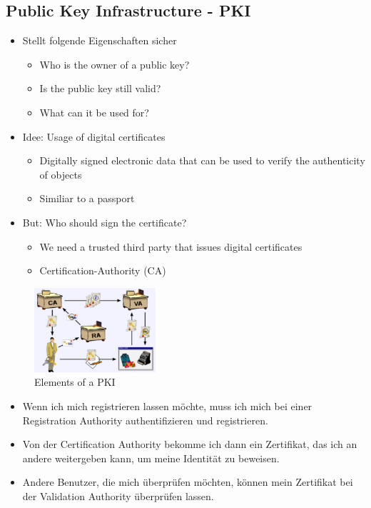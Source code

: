 \hypertarget{public-key-infrastructure---pki}{%
\subsection{Public Key Infrastructure -
PKI}\label{public-key-infrastructure---pki}}

\begin{itemize}
\tightlist
\item
  Stellt folgende Eigenschaften sicher

  \begin{itemize}
  \tightlist
  \item
    Who is the owner of a public key?
  \item
    Is the public key still valid?
  \item
    What can it be used for?
  \end{itemize}
\item
  Idee: Usage of digital certificates

  \begin{itemize}
  \tightlist
  \item
    Digitally signed electronic data that can be used to verify the
    authenticity of objects
  \item
    Similiar to a passport
  \end{itemize}
\item
  But: Who should sign the certificate?

  \begin{itemize}
  \tightlist
  \item
    We need a trusted third party that issues digital certificates
  \item
    Certification-Authority (CA)
  \end{itemize}
\end{itemize}

\begin{figure}[H]
\centering
\includegraphics[width=0.4\textwidth]{figures/elementsPKI.png}
\caption{Elements of a PKI}
\end{figure}

\begin{itemize}
\tightlist
\item
  Wenn ich mich registrieren lassen möchte, muss ich mich bei einer
  Registration Authority authentifizieren und registrieren.
\item
  Von der Certification Authority bekomme ich dann ein Zertifikat, das
  ich an andere weitergeben kann, um meine Identität zu beweisen.
\item
  Andere Benutzer, die mich überprüfen möchten, können mein Zertifikat
  bei der Validation Authority überprüfen lassen.
\end{itemize}

